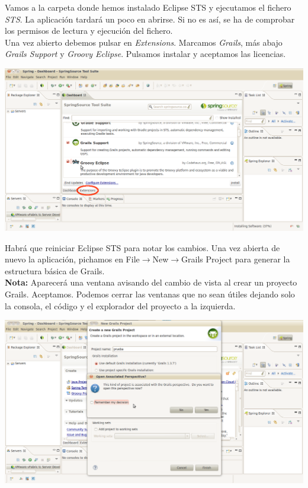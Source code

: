 \documentclass[a4paper,12pt,spanish]{article}
\begin{document}
Vamos a la carpeta donde hemos instalado Eclipse STS y ejecutamos el fichero {\it STS}. La aplicación tardará un poco en abrirse. Si no es así, se ha de comprobar los permisos de lectura y ejecución del fichero.\\

Una vez abierto debemos pulsar en {\it Extensions}. Marcamos {\it Grails}, más abajo {\it Grails Support} y {\it Groovy Eclipse}. Pulsamos instalar y aceptamos las licencias.

\begin{center}
\includegraphics[scale=0.35]{ide9}
\end{center}

Habrá que reiniciar Eclipse STS para notar los cambios. Una vez abierta de nuevo la aplicación, pichamos en File$\rightarrow$New$\rightarrow$Grails Project para generar la estructura básica de Grails.\\ 

{\bf Nota:} Aparecerá una ventana avisando del cambio de vista al crear un proyecto Grails. Aceptamos. Podemos cerrar las ventanas que no sean útiles dejando solo la consola, el código y el explorador del proyecto a la izquierda.

\begin{center}
\includegraphics[scale=0.35]{ide10}
\end{center}
\end{document}
